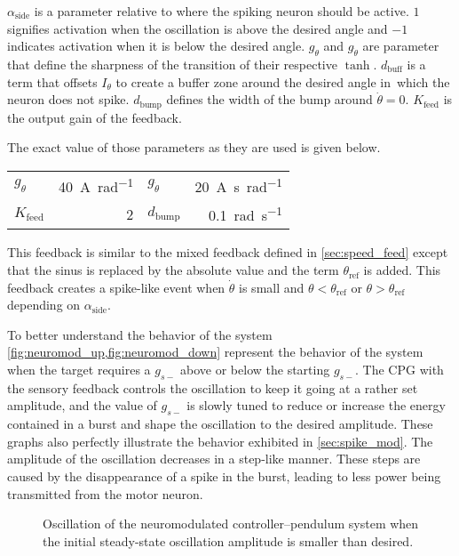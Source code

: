 $\alpha_\text{side}$ is a parameter relative to where the spiking neuron should be active.
$1$ signifies activation when the oscillation is above the desired angle and $-1$ indicates activation when it is below the desired angle.
$g_\theta$ and $g_{\dot{\theta}}$ are parameter that define the sharpness of the transition of their respective $\tanh$.
$d_\text{buff}$ is a term that offsets $I_\theta$ to create a buffer zone around the desired angle in which the neuron does not spike.
$d_\text{bump}$ defines the width of the bump around $\dot{\theta} = 0$.
$K_\text{feed}$ is the output gain of the feedback.

The exact value of those parameters as they are used is given below.
{

\large\centering
\begin{tabular}{lr|lr}
    $g_\theta$      & \qty{40}{\ampere\per\radian}   & $g_{\dot{\theta}}$    & \qty{20}{\ampere\second\per\radian}\\
    $K_\text{feed}$ & \num{2}                        & $d_\text{bump}$       & \qty{0.1}{\radian\per\second}
\end{tabular}

}

This feedback is similar to the mixed feedback defined in \cref{sec:speed_feed} except that the sinus is replaced by the absolute value and the term $\theta_\text{ref}$ is added.
This feedback creates a spike-like event when $\dot{\theta}$ is small and $\theta < \theta_\text{ref}$ or $\theta > \theta_\text{ref}$ depending on $\alpha_\text{side}$.

To better understand the behavior of the system \cref{fig:neuromod_up,fig:neuromod_down} represent the behavior of the system when the target requires a $g_{s-}$ above or below the starting $g_{s-}$.
The CPG with the sensory feedback controls the oscillation to keep it going at a rather set amplitude, and the value of $g_{s-}$ is slowly tuned to reduce or increase the energy contained in a burst and shape the oscillation to the desired amplitude.
These graphs also perfectly illustrate the behavior exhibited in \cref{sec:spike_mod}.
The amplitude of the oscillation decreases in a step-like manner.
These steps are caused by the disappearance of a spike in the burst, leading to less power being transmitted from the motor neuron.

\begin{figure}[!htbp]
    \centering
    \caption{Oscillation of the neuromodulated controller–pendulum system when the initial steady-state oscillation amplitude is smaller than desired.}
    \label{fig:neuromod_up}
\end{figure}


